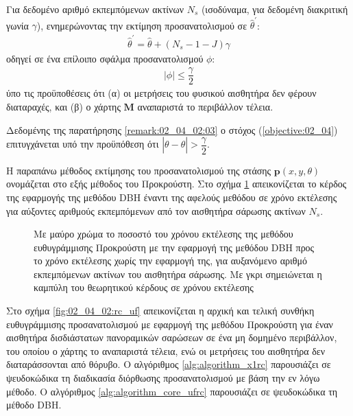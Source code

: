 \begin{gg_box}
\begin{remark}
  \label{remark:02_04_02:03}
  Για δεδομένο αριθμό εκπεμπόμενων ακτίνων $N_s$ (ισοδύναμα, για δεδομένη
  διακριτική γωνία $\gamma$), ενημερώνοντας την εκτίμηση προσανατολισμού σε
  $\hat{\theta}^\prime$:
  \begin{align}
    \hat{\theta}^\prime = \hat{\theta} + (N_s-1-J) \gamma \label{eq:update_t3}
  \end{align}
  οδηγεί σε ένα επίλοιπο σφάλμα προσανατολισμού $\phi$:
  \begin{align}
    |\phi| \leq \dfrac{\gamma}{2}  \label{eq:phi_3}
  \end{align}
  ύπο τις προϋποθέσεις ότι (α) οι μετρήσεις του φυσικού αισθητήρα δεν φέρουν
  διαταραχές, και (β) ο χάρτης $\bm{M}$ αναπαριστά το περιβάλλον τέλεια.
\end{remark}
\end{gg_box}

\begin{corollary}
  Δεδομένης της παρατήρησης \ref{remark:02_04_02:03} ο στόχος
  (\ref{objective:02_04}) επιτυγχάνεται υπό την προϋπόθεση ότι
  $|\theta-\hat{\theta}| > \dfrac{\gamma}{2}$.
\end{corollary}

Η παραπάνω μέθοδος εκτίμησης του προσανατολισμού της στάσης $\bm{p}(x,y,\theta)$
ονομάζεται στο εξής μέθοδος του Προκρούστη. Στο σχήμα
\ref{fig:02_04_02:ku_vs_dbh} απεικονίζεται το κέρδος της εφαρμογής της μεθόδου
DBH έναντι της αφελούς μεθόδου σε χρόνο εκτέλεσης για αύξοντες αριθμούς
εκπεμπόμενων από τον αισθητήρα σάρωσης ακτίνων $N_s$.

\begin{figure}[h]\centering
  \vspace{1.0cm}
  
  \vspace{0.5cm}
  \caption{\small Με μαύρο χρώμα το ποσοστό του χρόνου εκτέλεσης της μεθόδου
           ευθυγράμμισης Προκρούστη με την εφαρμογή της μεθόδου DBH προς το
           χρόνο εκτέλεσης χωρίς την εφαρμογή της, για αυξανόμενο αριθμό
           εκπεμπόμενων ακτίνων του αισθητήρα σάρωσης. Με γκρι σημειώνεται
           η καμπύλη του θεωρητικού κέρδους σε χρόνου εκτέλεσης}
  \label{fig:02_04_02:ku_vs_dbh}
\end{figure}

Στο σχήμα \ref{fig:02_04_02:rc_uf} απεικονίζεται η αρχική και τελική συνθήκη
ευθυγράμμισης προσανατολισμού με εφαρμογή της μεθόδου Προκρούστη για έναν
αισθητήρα δισδιάστατων πανοραμικών σαρώσεων σε ένα μη δομημένο περιβάλλον, του
οποίου ο χάρτης το αναπαριστά τέλεια, ενώ οι μετρήσεις του αισθητήρα δεν
διαταράσσονται από θόρυβο. Ο αλγόριθμος \ref{alg:algorithm_x1rc} παρουσιάζει
σε ψευδοκώδικα τη διαδικασία διόρθωσης προσανατολισμού με βάση την εν λόγω
μέθοδο. Ο αλγόριθμος \ref{alg:algorithm_core_ufrc} παρουσιάζει σε ψευδοκώδικα
τη μέθοδο DBH.

